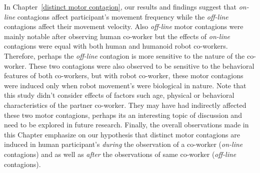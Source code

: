 In Chapter~\ref{distinct motor contagion}, our results and findings suggest that \textit{on-line} contagions affect participant's movement frequency while the \textit{off-line} contagions affect their movement velocity. Also \textit{off-line} motor contagions were mainly notable after observing human co-worker but the effects of \textit{on-line} contagions were equal with both human and humanoid robot co-workers. Therefore, perhaps the \textit{off-line} contagion is more sensitive to the nature of the co-worker. These two contagions were also observed to be sensitive to the behavioral features of both co-workers, but with robot co-worker, these motor contagions were induced only when robot movement's were biological in nature. Note that this study didn't consider effects of factors such age, physical or behavioral characteristics of the partner co-worker. They may have had indirectly affected these two motor contagions, perhaps its an interesting topic of discussion and need to be explored in future research. Finally, the overall observations made in this Chapter emphasize on our hypothesis that distinct motor contagions are induced in human participant's \emph{during} the observation of a co-worker (\textit{on-line} contagions) and as well as \emph{after} the observations of same co-worker (\textit{off-line} contagions).



